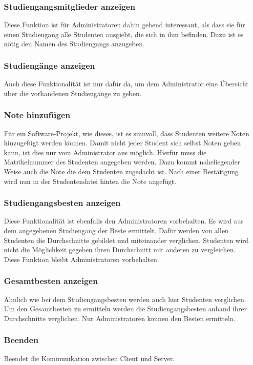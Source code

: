 \documentclass{scrartcl}
\begin{document}
		\subsubsection{Studiengangsmitglieder anzeigen}
			Diese Funktion ist für Administratoren dahin gehend interessant, als dass sie für einen Studiengang alle Studenten ausgiebt, die sich in ihm befinden. Dazu ist es nötig den Namen des Studiengangs anzugeben.
		\subsubsection{Studiengänge anzeigen}
			Auch diese Funktionalität ist nur dafür da, um dem Administrator eine Übersicht über die vorhandenen Studiengänge zu geben. 
		\subsubsection{Note hinzufügen}
			Für ein Software-Projekt, wie dieses, ist es sinnvoll, dass Studenten weitere Noten hinzugefügt werden können. Damit nicht jeder Student sich selbst Noten geben kann, ist dies nur vom Administrator aus möglich. Hierfür muss die Matrikelnummer des Studenten angegeben werden. Dazu kommt naheliegender Weise auch die Note die dem Studenten zugedacht ist. Nach einer Bestätigung wird nun in der Studentendatei hinten die Note angefügt.
		\subsubsection{Studiengangsbesten anzeigen}
			Diese Funktionalität ist ebenfalls den Administratoren vorbehalten. Es wird aus dem angegebenen Studiengang der Beste ermittelt. Dafür werden von allen Studenten die Durchschnitte gebildet und miteinander verglichen. Studenten wird nicht die Möglichkeit gegeben ihren Durchschnitt mit anderen zu vergleichen. Diese Funktion bleibt Administratoren vorbehalten.
		\subsubsection{Gesamtbesten anzeigen}
			Ähnlich wie bei dem Studiengangsbesten werden auch hier Studenten verglichen. Um den Gesamtbesten zu ermitteln werden die Studiengangsbesten anhand ihrer Durchschnitte verglichen. Nur Administratoren können den Besten ermitteln.
		\subsubsection{Beenden}
			Beendet die Kommunikation zwischen Client und Server. 
\end{document}
